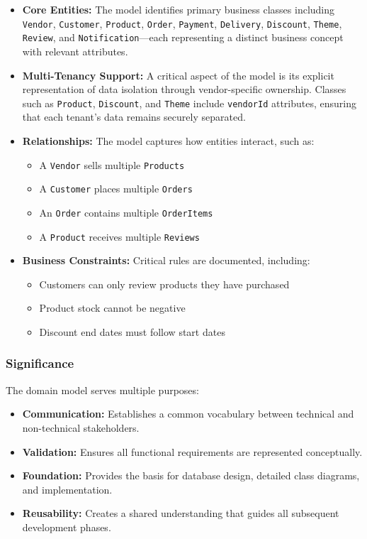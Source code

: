 \begin{itemize}
    \item \textbf{Core Entities:} The model identifies primary business classes including \texttt{Vendor}, \texttt{Customer}, \texttt{Product}, \texttt{Order}, \texttt{Payment}, \texttt{Delivery}, \texttt{Discount}, \texttt{Theme}, \texttt{Review}, and \texttt{Notification}—each representing a distinct business concept with relevant attributes.
    
    \item \textbf{Multi-Tenancy Support:} A critical aspect of the model is its explicit representation of data isolation through vendor-specific ownership. Classes such as \texttt{Product}, \texttt{Discount}, and \texttt{Theme} include \texttt{vendorId} attributes, ensuring that each tenant's data remains securely separated.
    
    \item \textbf{Relationships:} The model captures how entities interact, such as:
    \begin{itemize}
        \item A \texttt{Vendor} sells multiple \texttt{Products}
        \item A \texttt{Customer} places multiple \texttt{Orders}
        \item An \texttt{Order} contains multiple \texttt{OrderItems}
        \item A \texttt{Product} receives multiple \texttt{Reviews}
    \end{itemize}
    
    \item \textbf{Business Constraints:} Critical rules are documented, including:
    \begin{itemize}
        \item Customers can only review products they have purchased
        \item Product stock cannot be negative
        \item Discount end dates must follow start dates
    \end{itemize}
\end{itemize}

\subsubsection*{Significance}

The domain model serves multiple purposes:

\begin{itemize}
    \item \textbf{Communication:} Establishes a common vocabulary between technical and non-technical stakeholders.
    \item \textbf{Validation:} Ensures all functional requirements are represented conceptually.
    \item \textbf{Foundation:} Provides the basis for database design, detailed class diagrams, and implementation.
    \item \textbf{Reusability:} Creates a shared understanding that guides all subsequent development phases.
\end{itemize}

